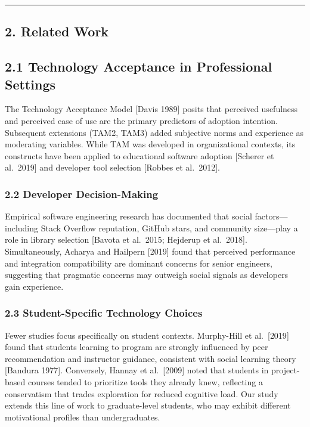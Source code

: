 \documentclass[
]{article}
\begin{document}
\begin{center}\rule{0.5\linewidth}{0.5pt}\end{center}

\subsection{2. Related Work}\label{related-work}

\subsection{2.1 Technology Acceptance in Professional
Settings}\label{technology-acceptance-in-professional-settings}

The Technology Acceptance Model {[}Davis 1989{]} posits that perceived
usefulness and perceived ease of use are the primary predictors of
adoption intention. Subsequent extensions (TAM2, TAM3) added subjective
norms and experience as moderating variables. While TAM was developed in
organizational contexts, its constructs have been applied to educational
software adoption {[}Scherer et al.~2019{]} and developer tool selection
{[}Robbes et al.~2012{]}.

\subsubsection{2.2 Developer
Decision-Making}\label{developer-decision-making}

Empirical software engineering research has documented that social
factors---including Stack Overflow reputation, GitHub stars, and
community size---play a role in library selection {[}Bavota et al.~2015;
Hejderup et al.~2018{]}. Simultaneously, Acharya and Hailpern {[}2019{]}
found that perceived performance and integration compatibility are
dominant concerns for senior engineers, suggesting that pragmatic
concerns may outweigh social signals as developers gain experience.

\subsubsection{2.3 Student-Specific Technology
Choices}\label{student-specific-technology-choices}

Fewer studies focus specifically on student contexts. Murphy-Hill et
al.~{[}2019{]} found that students learning to program are strongly
influenced by peer recommendation and instructor guidance, consistent
with social learning theory {[}Bandura 1977{]}. Conversely, Hannay et
al.~{[}2009{]} noted that students in project-based courses tended to
prioritize tools they already knew, reflecting a conservatism that
trades exploration for reduced cognitive load. Our study extends this
line of work to graduate-level students, who may exhibit different
motivational profiles than undergraduates.
\end{document}
